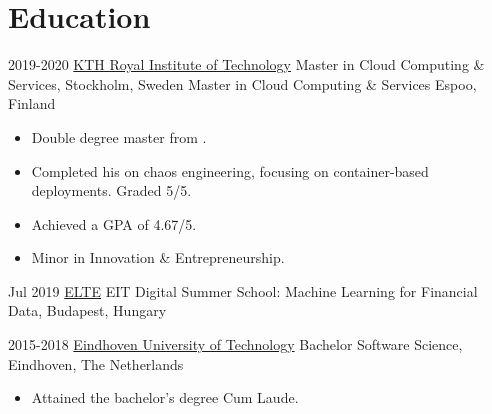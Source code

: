 \section{Education}{
 
 \customcventry
 {2019-2020}
 {\color{blue}\href{https://kth.se/en}{KTH Royal Institute of Technology}}
 {Master in Cloud Computing \& Services,}
 {Stockholm, Sweden}
 {}{}{} %
 {\color{white}Master in Cloud Computing \& Services}
 {Espoo, Finland}{}{}
 {
 	\begin{itemize}[leftmargin=0.6cm, label={\textbullet}]
 		\item Double degree master from .
 		\item Completed his  on chaos engineering, focusing on container-based deployments. Graded 5/5.
 		\item Achieved a GPA of 4.67/5.
 		\item Minor in Innovation \& Entrepreneurship.
 	\end{itemize}
 }
 
 \customcventry
 {Jul 2019}
 {\color{blue}\href{https://www.elte.hu/en/}{ELTE}}
 {EIT Digital Summer School: Machine Learning for Financial Data,}
 {Budapest, Hungary}
 {}{}
 {
\vspace{2mm} %
 }
 
 \customcventry
 {2015-2018}
 {\color{blue}\href{https://tue.nl/}{Eindhoven University of Technology}}
 {Bachelor Software Science,}
 {Eindhoven, The Netherlands}{}{}
 {
 	\begin{itemize}[leftmargin=0.6cm, label={\textbullet}]
 		\item Attained the bachelor's degree Cum Laude. 
 	\end{itemize}
 }
 
}
